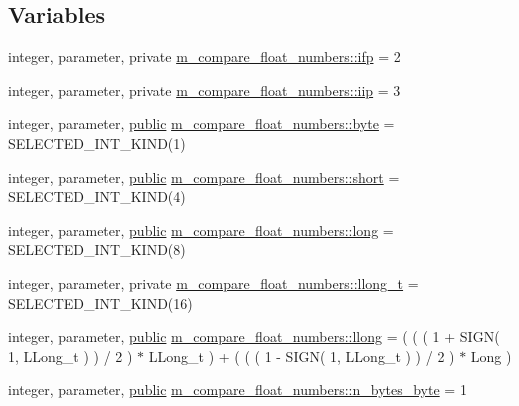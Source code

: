 \subsection*{Variables}
\begin{DoxyCompactItemize}
\item 
integer, parameter, private \hyperlink{namespacem__compare__float__numbers_abdbebb777d8ce2fa018e86724bfdfb9e}{m\+\_\+compare\+\_\+float\+\_\+numbers\+::ifp} = 2
\item 
integer, parameter, private \hyperlink{namespacem__compare__float__numbers_a6fab297801aadc3067acefdd136384ad}{m\+\_\+compare\+\_\+float\+\_\+numbers\+::iip} = 3
\item 
integer, parameter, \hyperlink{M__stopwatch_83_8txt_a2f74811300c361e53b430611a7d1769f}{public} \hyperlink{namespacem__compare__float__numbers_ae232d1653572b564934db62fc9caaa93}{m\+\_\+compare\+\_\+float\+\_\+numbers\+::byte} = S\+E\+L\+E\+C\+T\+E\+D\+\_\+\+I\+N\+T\+\_\+\+K\+I\+ND(1)
\item 
integer, parameter, \hyperlink{M__stopwatch_83_8txt_a2f74811300c361e53b430611a7d1769f}{public} \hyperlink{namespacem__compare__float__numbers_a8afcd039ad8a1e52969e5a5165163b68}{m\+\_\+compare\+\_\+float\+\_\+numbers\+::short} = S\+E\+L\+E\+C\+T\+E\+D\+\_\+\+I\+N\+T\+\_\+\+K\+I\+ND(4)
\item 
integer, parameter, \hyperlink{M__stopwatch_83_8txt_a2f74811300c361e53b430611a7d1769f}{public} \hyperlink{namespacem__compare__float__numbers_a1a70f80b01ccf5c63ed3eb70fabdaf2d}{m\+\_\+compare\+\_\+float\+\_\+numbers\+::long} = S\+E\+L\+E\+C\+T\+E\+D\+\_\+\+I\+N\+T\+\_\+\+K\+I\+ND(8)
\item 
integer, parameter, private \hyperlink{namespacem__compare__float__numbers_a7c4a2b4cc39888d092d7a754897be9e5}{m\+\_\+compare\+\_\+float\+\_\+numbers\+::llong\+\_\+t} = S\+E\+L\+E\+C\+T\+E\+D\+\_\+\+I\+N\+T\+\_\+\+K\+I\+ND(16)
\item 
integer, parameter, \hyperlink{M__stopwatch_83_8txt_a2f74811300c361e53b430611a7d1769f}{public} \hyperlink{namespacem__compare__float__numbers_a9c3da9dd020c03b19ee8acf1dafdce20}{m\+\_\+compare\+\_\+float\+\_\+numbers\+::llong} = ( ( ( 1 + S\+I\+GN( 1, L\+Long\+\_\+t ) ) / 2 ) $\ast$ L\+Long\+\_\+t ) + ( ( ( 1 -\/ S\+I\+GN( 1, L\+Long\+\_\+t ) ) / 2 ) $\ast$ Long )
\item 
integer, parameter, \hyperlink{M__stopwatch_83_8txt_a2f74811300c361e53b430611a7d1769f}{public} \hyperlink{namespacem__compare__float__numbers_a5faf0176b9b713e8d12ede8294da171d}{m\+\_\+compare\+\_\+float\+\_\+numbers\+::n\+\_\+bytes\+\_\+byte} = 1

\end{DoxyCompactItemize}
